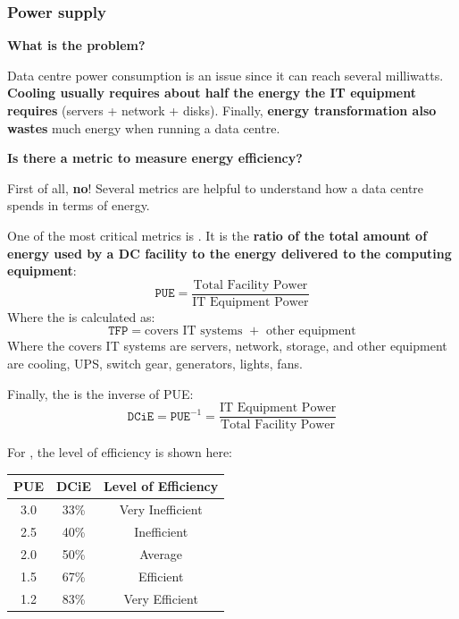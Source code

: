 \newpage

\subsubsection{Power supply}

\begin{flushleft}
	\textcolor{Green3}{ \textbf{What is the problem?}}
\end{flushleft}
Data centre power consumption is an issue since it can reach several milliwatts. \textbf{Cooling usually requires about half the energy the IT equipment requires} (servers + network + disks). Finally, \textbf{energy transformation also wastes} much energy when running a data centre.

\highspace
\begin{flushleft}
	\textcolor{Green3}{ \textbf{Is there a metric to measure energy efficiency?}}
\end{flushleft}
First of all, \textbf{no}! Several metrics are helpful to understand how a data centre spends in terms of energy.

\highspace
One of the most critical metrics is . It is the \textbf{ratio of the total amount of energy used by a DC facility to the energy delivered to the computing equipment}:
\begin{equation}
	\texttt{PUE} = \dfrac{
		\text{Total Facility Power}
	}{
		\text{IT Equipment Power}
	}
\end{equation}
Where the  is calculated as:
\begin{equation}
	\texttt{TFP} = \text{covers IT systems } + \text{ other equipment}
\end{equation}
Where the covers IT systems are servers, network, storage, and other equipment are cooling, UPS, switch gear, generators, lights, fans.

\highspace
Finally, the  is the inverse of PUE:
\begin{equation}
	\texttt{DCiE} = \texttt{PUE}^{-1} = \dfrac{
		\text{IT Equipment Power}
	}{
		\text{Total Facility Power}
	}
\end{equation}

\highspace
For , the level of efficiency is shown here:
\begin{table}[!htp]
	\centering
	\begin{tabular}{@{} c c c @{}}
		\toprule
		\textbf{PUE} & \textbf{DCiE} & \textbf{Level of Efficiency} \\
		\midrule
		3.0 & 33\% & Very Inefficient \\
		2.5 & 40\% & Inefficient \\
		2.0 & 50\% & Average \\
		1.5 & 67\% & Efficient \\
		1.2 & 83\% & Very Efficient \\
		\bottomrule
	\end{tabular}
\end{table}

